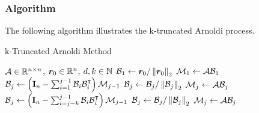 \begin{frame}[fragile]
    \frametitle{Algorithm}

    The following algorithm illustrates the k-truncated Arnoldi process.

    \begin{algorithm}[H]
    \caption{k-Truncated Arnoldi Method} \label{alg:arnoldi}
    \begin{algorithmic}
    \Require $\mathcal{A} \in \mathbb{R}^{n \times n}$, $\bm{r}_0 \in \mathbb{R}^{n}$, $d, k \in \mathbb{N}$
    \State $\mathcal{B}_1 \gets \bm{r}_0 / \left\lVert \bm{r}_0 \right\rVert_2$
    \State $\mathcal{M}_1 \gets \mathcal{A} \mathcal{B}_1$
        \State $\mathcal{B}_j \gets \left( \mathbf{I}_n - \sum_{i=1}^{j-1} \mathcal{B}_i \mathcal{B}_i^{\intercal} \right) \mathcal{M}_{j-1}$
        \State $\mathcal{B}_j \gets \mathcal{B}_j / \left\lVert \mathcal{B}_j \right\rVert_2$
        \State $\mathcal{M}_j \gets \mathcal{A} \mathcal{B}_j$
    \EndFor
        \State $\mathcal{B}_j \gets \left( \mathbf{I}_n - \sum_{i=j-k}^{j-1} \mathcal{B}_i \mathcal{B}_i^{\intercal} \right) \mathcal{M}_{j-1}$
        \State $\mathcal{B}_j \gets \mathcal{B}_j / \left\lVert \mathcal{B}_j \right\rVert_2$
        \State $\mathcal{M}_j \gets \mathcal{A} \mathcal{B}_j$
    \EndFor
    \end{algorithmic}
    \end{algorithm}

\end{frame}








